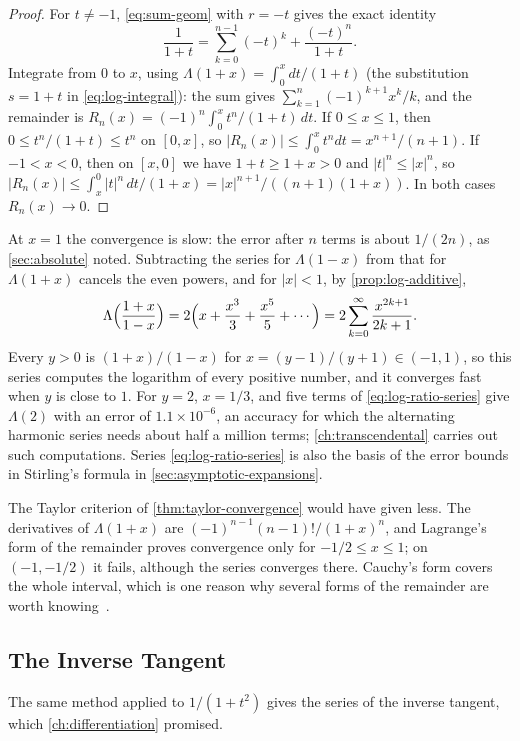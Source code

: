 \begin{proof}
For $t\ne-1$, \eqref{eq:sum-geom} with $r=-t$ gives the exact identity
\[
\frac1{1+t}=\sum_{k=0}^{n-1}(-t)^k+\frac{(-t)^n}{1+t}.
\]
Integrate from $0$ to $x$, using $\Lambda(1+x)=\int_0^xdt/(1+t)$ (the substitution $s=1+t$ in \eqref{eq:log-integral}): the sum gives $\sum_{k=1}^n(-1)^{k+1}x^k/k$, and the remainder is $R_n(x)=(-1)^n\int_0^xt^n/(1+t)\,dt$. If $0\le x\le1$, then $0\le t^n/(1+t)\le t^n$ on $[0,x]$, so $|R_n(x)|\le\int_0^xt^ndt=x^{n+1}/(n+1)$. If $-1<x<0$, then on $[x,0]$ we have $1+t\ge1+x>0$ and $|t|^n\le|x|^n$, so $|R_n(x)|\le\int_x^0|t|^n\,dt/(1+x)=|x|^{n+1}/((n+1)(1+x))$. In both cases $R_n(x)\to0$.
\end{proof}

At $x=1$ the convergence is slow: the error after $n$ terms is about $1/(2n)$, as \cref{sec:absolute} noted. Subtracting the series for $\Lambda(1-x)$ from that for $\Lambda(1+x)$ cancels the even powers, and for $|x|<1$, by \cref{prop:log-additive},
\begin{equation}
\Lambda\Bigl(\frac{1+x}{1-x}\Bigr)=2\Bigl(x+\frac{x^3}3+\frac{x^5}5+\cdots\Bigr)=2\sum_{k=0}^\infty\frac{x^{2k+1}}{2k+1}.
\label{eq:log-ratio-series}
\end{equation}
Every $y>0$ is $(1+x)/(1-x)$ for $x=(y-1)/(y+1)\in(-1,1)$, so this series computes the logarithm of every positive number, and it converges fast when $y$ is close to $1$. For $y=2$, $x=1/3$, and five terms of \eqref{eq:log-ratio-series} give $\Lambda(2)$ with an error of $1.1\times10^{-6}$, an accuracy for which the alternating harmonic series needs about half a million terms; \cref{ch:transcendental} carries out such computations. Series \eqref{eq:log-ratio-series} is also the basis of the error bounds in Stirling's formula in \cref{sec:asymptotic-expansions}.

The Taylor criterion of \cref{thm:taylor-convergence} would have given less. The derivatives of $\Lambda(1+x)$ are $(-1)^{n-1}(n-1)!/(1+x)^n$, and Lagrange's form of the remainder proves convergence only for $-1/2\le x\le1$; on $(-1,-1/2)$ it fails, although the series converges there. Cauchy's form covers the whole interval, which is one reason why several forms of the remainder are worth knowing~\cite{apostol1967calculus}.

\subsection{The Inverse Tangent}

The same method applied to $1/(1+t^2)$ gives the series of the inverse tangent, which \cref{ch:differentiation} promised.

